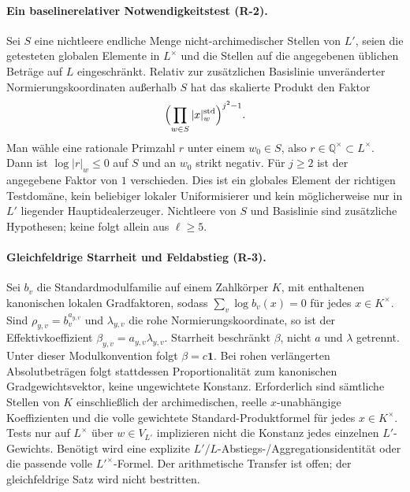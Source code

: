 \documentclass[11pt,a4paper]{article}
\theoremstyle{definition}
\theoremstyle{remark}
\begin{document}
\paragraph{Ein baseline\-relativer Notwendigkeitstest (R-2).}
Sei $S$ eine nichtleere endliche Menge nicht-archimedischer Stellen von
$L'$, seien die getesteten globalen Elemente in $L^\times$ und die
Stellen auf die angegebenen üblichen Beträge auf $L$ eingeschränkt.
Relativ zur zusätzlichen Basislinie unveränderter Normierungskoordinaten
außerhalb $S$ hat das skalierte Produkt den Faktor
\[
 \Bigl(\prod_{w\in S}|x|_w^{\mathrm{std}}\Bigr)^{j^2-1}.
\]
Man wähle eine rationale Primzahl $r$ unter einem $w_0\in S$, also
$r\in\mathbb Q^\times\subset L^\times$. Dann ist $\log|r|_w\le0$ auf
$S$ und an $w_0$ strikt negativ. Für $j\ge2$ ist der angegebene Faktor
von $1$ verschieden. Dies ist ein globales Element der richtigen
Testdomäne, kein beliebiger lokaler Uniformisierer und kein möglicherweise
nur in $L'$ liegender Hauptidealerzeuger. Nichtleere von $S$ und Basislinie
sind zusätzliche Hypothesen; keine folgt allein aus $\ell\ge5$.

\paragraph{Gleichfeldrige Starrheit und Feldabstieg (R-3).}
Sei $b_v$ die Standardmodulfamilie auf einem Zahlkörper $K$, mit
enthaltenen kanonischen lokalen Gradfaktoren, sodass
$\sum_v\log b_v(x)=0$ für jedes $x\in K^\times$. Sind
$\rho_{y,v}=b_v^{a_{y,v}}$ und $\lambda_{y,v}$ die rohe
Normierungskoordinate, so ist der Effektivkoeffizient
$\beta_{y,v}=a_{y,v}\lambda_{y,v}$. Starrheit beschränkt $\beta$, nicht
$a$ und $\lambda$ getrennt. Unter dieser Modulkonvention folgt
$\beta=c\mathbf1$. Bei rohen verlängerten Absolutbeträgen folgt
stattdessen Proportionalität zum kanonischen Gradgewichtsvektor, keine
ungewichtete Konstanz. Erforderlich sind sämtliche Stellen von $K$
einschließlich der archimedischen, reelle $x$-unabhängige Koeffizienten und
die volle gewichtete Standard-Produktformel für jedes $x\in K^\times$.
Tests nur auf $L^\times$ über $w\in V_{L'}$ implizieren nicht die
Konstanz jedes einzelnen $L'$-Gewichts. Benötigt wird eine explizite
$L'/L$-Abstiegs-/Aggregationsidentität oder die passende volle
$L'^\times$-Formel. Der arithmetische Transfer ist offen; der gleichfeldrige
Satz wird nicht bestritten.
\end{document}
